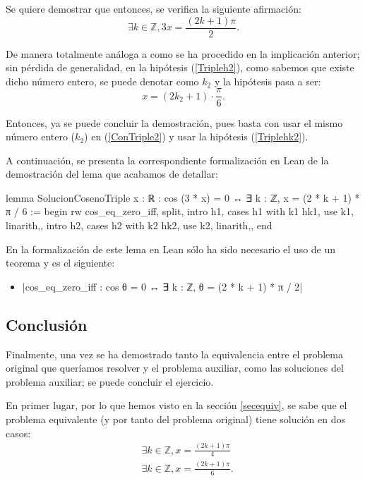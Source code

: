 \begin{demostracion}
  Se quiere demostrar que entonces, se verifica la siguiente
  afirmación:
  \begin{equation}\label{ConTriple2}
    ∃k∈ ℤ,3x=\frac{(2k+1)π}{2}.
  \end{equation}

  De manera totalmente análoga a como se ha procedido en la
  implicación anterior; sin pérdida de generalidad, en la
  hipótesis (\ref{Tripleh2}), como sabemos que existe dicho número
  entero, se puede denotar como \(k_2\) y la hipótesis pasa a ser:
  \begin{equation}\label{Triplehk2}\tag{hk2}
     x=(2k_2+1)⋅\frac{π}{6}.
   \end{equation}

   Entonces, ya se puede concluir la demostración, pues basta con
   usar el mismo número entero (\(k_2\)) en (\ref{ConTriple2}) y
   usar la hipótesis (\ref{Triplehk2}).
\end{demostracion}

A continuación, se presenta la correspondiente formalización
en Lean de la demostración del lema que acabamos de detallar:
\begin{leancode}
lemma SolucionCosenoTriple {x : ℝ} : cos (3 * x) = 0 ↔ 
∃ k : ℤ, x = (2 * k + 1) * π / 6 :=
begin
  rw cos_eq_zero_iff,
  split,
  {intro h1,
  cases h1 with k1 hk1,
  use k1,
  linarith,},
  {intro h2,
  cases h2 with k2 hk2,
  use k2,
  linarith,},
end
\end{leancode}

En la formalización de este lema en Lean sólo ha sido necesario
el uso de un teorema y es el siguiente:
\begin{itemize}
\item {}|cos_eq_zero_iff :  cos θ = 0 ↔ ∃ k : ℤ, θ = (2 * k + 1) * π / 2|
\end{itemize} 

\subsection{Conclusión}
Finalmente, una vez se ha demostrado tanto la equivalencia entre el
problema original que queríamos resolver y el problema auxiliar,
como las soluciones del problema auxiliar; se puede concluir el
ejercicio.

En primer lugar, por lo que hemos visto en la sección
\ref{secequiv}, se sabe que el problema equivalente
(y por tanto del problema original) tiene solución en dos casos:
\begin{align}
  &∃k∈ℤ, x=\frac{(2k+1)π}{4}\label{condicion1}\\
  &∃k∈ℤ, x=\frac{(2k+1)π}{6}.\label{condicion2}
\end{align}

